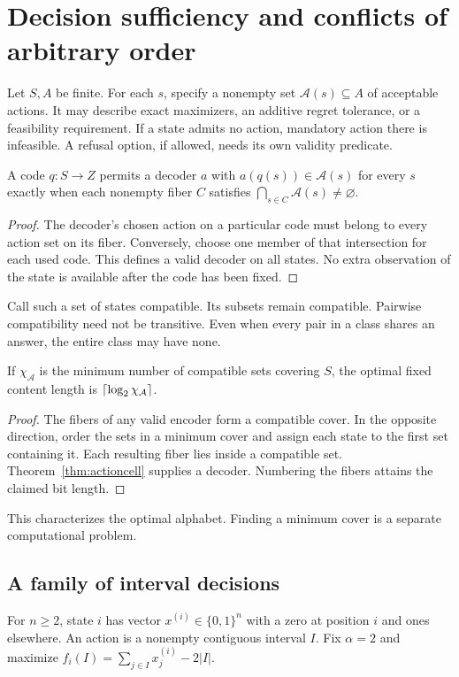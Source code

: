 \section{Decision sufficiency and conflicts of arbitrary order}\label{sec:decision}
Let $S,A$ be finite. For each $s$, specify a nonempty set $\mathcal A(s)\subseteq A$ of acceptable actions. It may describe exact maximizers, an additive regret tolerance, or a feasibility requirement. If a state admits no action, mandatory action there is infeasible. A refusal option, if allowed, needs its own validity predicate.

\begin{theorem}\label{thm:actioncell}
A code $q:S\to Z$ permits a decoder $a$ with $a(q(s))\in\mathcal A(s)$ for every $s$ exactly when each nonempty fiber $C$ satisfies $\bigcap_{s\in C}\mathcal A(s)\ne\varnothing$.
\end{theorem}
\begin{proof}
The decoder's chosen action on a particular code must belong to every action set on its fiber. Conversely, choose one member of that intersection for each used code. This defines a valid decoder on all states. No extra observation of the state is available after the code has been fixed.
\end{proof}
Call such a set of states compatible. Its subsets remain compatible. Pairwise compatibility need not be transitive. Even when every pair in a class shares an answer, the entire class may have none.

\begin{corollary}\label{cor:cover}
If $\chi_{\mathcal A}$ is the minimum number of compatible sets covering $S$, the optimal fixed content length is $\left\lceil \log_2\chi_{\mathcal A}\right\rceil$.
\end{corollary}
\begin{proof}
The fibers of any valid encoder form a compatible cover. In the opposite direction, order the sets in a minimum cover and assign each state to the first set containing it. Each resulting fiber lies inside a compatible set. Theorem~\ref{thm:actioncell} supplies a decoder. Numbering the fibers attains the claimed bit length.
\end{proof}
This characterizes the optimal alphabet. Finding a minimum cover is a separate computational problem.

\subsection{A family of interval decisions}
For $n\ge2$, state $i$ has vector $x^{(i)}\in\{0,1\}^n$ with a zero at position $i$ and ones elsewhere. An action is a nonempty contiguous interval $I$. Fix $\alpha=2$ and maximize $f_i(I)=\sum_{j\in I}x_j^{(i)}-2|I|$.

